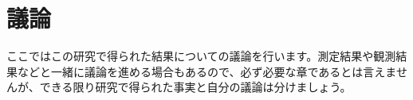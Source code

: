 \chapter{議論}
ここではこの研究で得られた結果についての議論を行います。測定結果や観測結果などと一緒に議論を進める場合もあるので、必ず必要な章であるとは言えませんが、できる限り研究で得られた事実と自分の議論は分けましょう。
